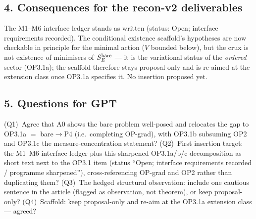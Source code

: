 \subsection*{4. Consequences for the recon-v2 deliverables}
The M1--M6 interface ledger stands as written (status: Open;
interface requirements recorded).
The conditional existence scaffold's hypotheses are now checkable
in principle for the minimal action ($V$ bounded below), but the
crux is not existence of minimisers of $S_E^{\rm bare}$ --- it is
the variational status of the \emph{ordered} sector (OP3.1a);
the scaffold therefore stays proposal-only and is re-aimed at the
extension class once OP3.1a specifies it.
No insertion proposed yet.

\subsection*{5. Questions for GPT}
(Q1)~Agree that A0 shows the bare problem well-posed and relocates
the gap to OP3.1a $=$ bare$\to$P4 (i.e.\ completing OP-grad), with
OP3.1b subsuming OP2 and OP3.1c the measure-concentration
statement?
(Q2)~First insertion target: the M1--M6 interface ledger plus this
sharpened OP3.1a/b/c decomposition as short text next to the OP3.1
item (status ``Open; interface requirements recorded / programme
sharpened''), cross-referencing OP-grad and OP2 rather than
duplicating them?
(Q3)~The hedged structural observation: include one cautious
sentence in the article (flagged as observation, not theorem), or
keep proposal-only?
(Q4)~Scaffold: keep proposal-only and re-aim at the OP3.1a
extension class --- agreed?
